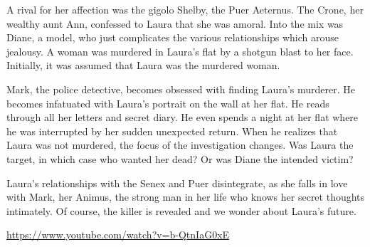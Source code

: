 A rival for her affection was the gigolo Shelby, the Puer Aeternus. The Crone, her wealthy aunt Ann, confessed to Laura that she was amoral. Into the mix was Diane, a model, who just complicates the various relationships which arouse jealousy. A woman was murdered in Laura's flat by a shotgun blast to her face. Initially, it was assumed that Laura was the murdered woman.

Mark, the police detective, becomes obsessed with finding Laura's murderer. He becomes infatuated with Laura's portrait on the wall at her flat. He reads through all her letters and secret diary. He even spends a night at her flat where he was interrupted by her sudden unexpected return. When he realizes that Laura was not murdered, the focus of the investigation changes. Was Laura the target, in which case who wanted her dead? Or was Diane the intended victim?

Laura's relationships with the Senex and Puer disintegrate, as she falls in love with Mark, her Animus, the strong man in her life who knows her secret thoughts intimately. Of course, the killer is revealed and we wonder about Laura's future.

\url{https://www.youtube.com/watch?v=b-QtnIaG0xE}


